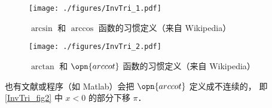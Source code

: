 
\begin{issues}
\issueDraft
\end{issues}

\begin{figure}[ht]
\centering
\texttt{[image: ./figures/InvTri\_1.pdf]}
\caption{$\arcsin$ 和 $\arccos$ 函数的习惯定义（来自 Wikipedia）} \label{InvTri_fig1}
\end{figure}

\begin{figure}[ht]
\centering
\texttt{[image: ./figures/InvTri\_2.pdf]}
\caption{$\arctan$ 和 $\opn{arccot}$ 函数的习惯定义（来自 Wikipedia）} \label{InvTri_fig2}
\end{figure}

也有文献或程序（如 Matlab）会把 $\opn{arccot}$ 定义成不连续的， 即\autoref{InvTri_fig2} 中 $x<0$ 的部分下移 $\pi$．
